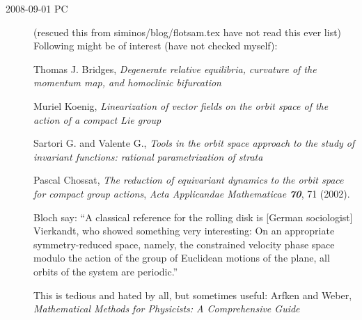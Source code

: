 \begin{description}
\item[2008-09-01 PC] (rescued this from siminos/blog/flotsam.tex
have not read this ever list)
Following might be of interest (have not checked myself):


\noindent
Thomas J. Bridges,
{\emph{Degenerate relative equilibria,}}
\emph{curvature of the momentum map, and homoclinic bifurcation}

Muriel Koenig,
{\emph{Linearization of vector fields}}
\emph{ on the orbit space of the action of a compact Lie group}

Sartori G. and Valente G.,
{\emph{Tools in the orbit space approach}}
\emph{to the study of invariant functions: rational parametrization of strata}

Pascal Chossat,
{\emph{The reduction of equivariant dynamics}}
\emph{to the orbit space for compact group actions},
{\em Acta Applicandae Mathematicae \bf 70}, 71 (2002). %

     {Bloch \etal} say:
``A classical reference for the rolling disk is [German
sociologist]
{Vierkandt}, who showed
something very interesting: On an appropriate
symmetry-reduced space, namely, the constrained velocity
phase space modulo the action of the group of Euclidean
motions of the plane, all orbits of the system are
periodic.''

This is tedious and hated by all, but sometimes useful:
Arfken and Weber,
\emph{Mathematical Methods for Physicists: A Comprehensive Guide
}



\end{description}

